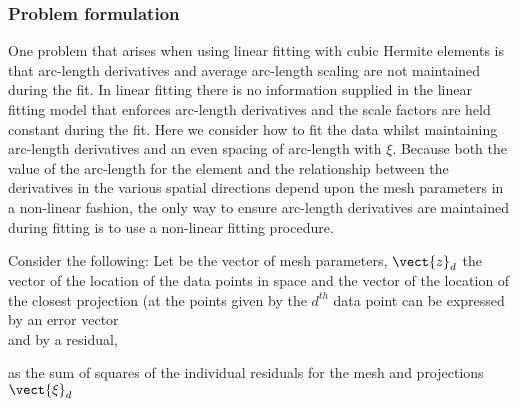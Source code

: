 \subsubsection{Problem formulation}

One problem that arises when using linear fitting with cubic Hermite elements
is that arc-length derivatives and average arc-length scaling are not
maintained during the fit. In linear fitting there is no information supplied
in the linear fitting model that enforces arc-length derivatives and the scale
factors are held constant during the fit. Here we consider how to fit the data
whilst maintaining arc-length derivatives and an even spacing of arc-length
with $\xi$. Because both the value of the arc-length for the element and the
relationship between the derivatives in the various spatial directions depend
upon the mesh parameters in a non-linear fashion, the only way to ensure
arc-length derivatives are maintained during fitting is to use a non-linear
fitting procedure.

Consider the following: Let  be the vector of mesh parameters, 
$\vect{z}_{d}$ the vector of the location of the data points in space and 
the vector of the location of the closest projection (at the points given by
the $d^{th}$ data point can be expressed by an error vector
\begin{equation}
\label{eqn:errorvec}
\end{equation}
and by a residual,
\begin{equation}
\label{eqn:dataresidvec}
\end{equation}

as the sum of squares of the individual residuals for the mesh  and
projections $\vect{\xi}_{d}$
\begin{equation}
\label{eqn:dataresfun}
\end{equation}
\begin{eqnarray*}
\end{eqnarray*}

